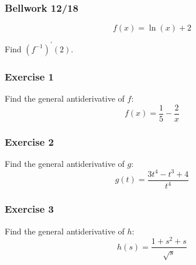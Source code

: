 \documentclass[12pt]{beamer}
\begin{document}
\begin{frame}
	\frametitle{Bellwork 12/18}
	\initclock

	\vfill
	\LARGE
	\[f(x)=\ln(x)+2\]
	\vfill
	\begin{center}
		Find $(f^{-1})^{'}(2)$.
	\end{center}
	\vfill
	\vfill
	\vfill
	\vfill
	\vfill
	\vfill

	\small
	\crono
\end{frame}
\begin{frame}
	\frametitle{Exercise 1}

	\Large
	Find the general antiderivative of $f$:
	\[f(x)=\frac{1}{5}-\frac{2}{x}\]
\end{frame}
\begin{frame}
	\frametitle{Exercise 2}

	\Large
	Find the general antiderivative of $g$:
	\[g(t)=\frac{3t^4-t^3+4}{t^4}\]
\end{frame}
\begin{frame}
	\frametitle{Exercise 3}

	\Large
	Find the general antiderivative of $h$:
	\[h(s)=\frac{1+s^2+s}{\sqrt{s}}\]
\end{frame}
\end{document}
